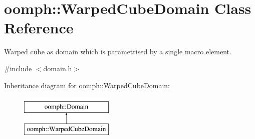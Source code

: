 \hypertarget{classoomph_1_1WarpedCubeDomain}{}\section{oomph\+:\+:Warped\+Cube\+Domain Class Reference}
\label{classoomph_1_1WarpedCubeDomain}


Warped cube as domain which is parametrised by a single macro element.  




{\ttfamily \#include $<$domain.\+h$>$}

Inheritance diagram for oomph\+:\+:Warped\+Cube\+Domain\+:\begin{figure}[H]
\begin{center}
\leavevmode
\includegraphics[height=2.000000cm]{classoomph_1_1WarpedCubeDomain}
\end{center}
\end{figure}
